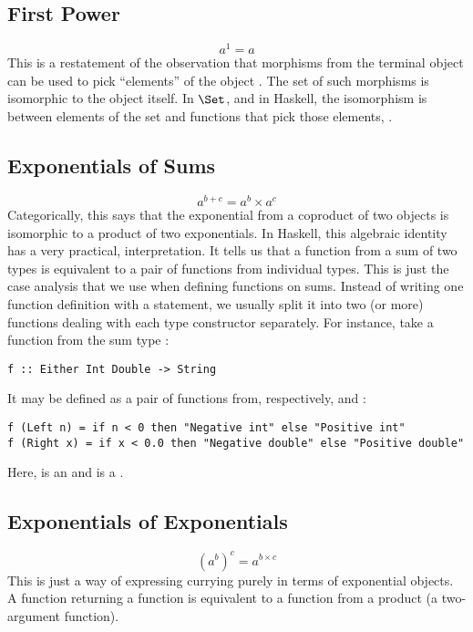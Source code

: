 \subsection{First Power}

\[a^{1} = a\]
This is a restatement of the observation that morphisms from the
terminal object can be used to pick ``elements'' of the object
. The set of such morphisms is isomorphic to the object
itself. In $\Set$, and in Haskell, the isomorphism is between
elements of the set  and functions that pick those elements,
.

\subsection{Exponentials of Sums}

\[a^{b+c} = a^{b} \times a^{c}\]
Categorically, this says that the exponential from a coproduct of two
objects is isomorphic to a product of two exponentials. In Haskell, this
algebraic identity has a very practical, interpretation. It tells us
that a function from a sum of two types is equivalent to a pair of
functions from individual types. This is just the case analysis that we
use when defining functions on sums. Instead of writing one function
definition with a  statement, we usually split it into two
(or more) functions dealing with each type constructor separately. For
instance, take a function from the sum type
:

\begin{Verbatim}
f :: Either Int Double -> String
\end{Verbatim}
It may be defined as a pair of functions from, respectively,
 and :

\begin{verbatim}
f (Left n) = if n < 0 then "Negative int" else "Positive int"
f (Right x) = if x < 0.0 then "Negative double" else "Positive double"
\end{verbatim}
Here,  is an  and  is a .

\subsection{Exponentials of Exponentials}

\[(a^{b})^{c} = a^{b \times c}\]
This is just a way of expressing currying purely in terms of exponential
objects. A function returning a function is equivalent to a function
from a product (a two-argument function).

